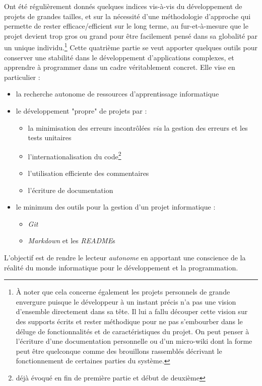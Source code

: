 \documentclass[../../main.tex]{subfiles}
\begin{document}
Ont été régulièrement donnés quelques indices vis-à-vis du développement de projets de grandes tailles, et sur la nécessité d'une méthodologie d'approche qui permette de rester efficace/efficient sur le long terme, au fur-et-à-mesure que le projet devient trop gros ou grand pour être facilement pensé dans sa globalité par un unique individu.\footnote{À noter que cela concerne également les projets personnels de grande envergure puisque le développeur à un instant précis n'a pas une vision d'ensemble directement dans sa tête. Il lui a fallu découper cette vision sur des supports écrits et rester méthodique pour ne pas s'embourber dans le déluge de fonctionnalités et de caractéristiques du projet. On peut penser à l'écriture d'une documentation personnelle ou d'un micro-wiki dont la forme peut être quelconque comme des brouillons rassemblés décrivant le fonctionnement de certaines parties du système.} Cette quatrième partie se veut apporter quelques outils pour conserver une stabilité dans le développement d'applications complexes, et apprendre à programmer dans un cadre véritablement concret. Elle vise en particulier :
\begin{itemize}
	\item la recherche autonome de ressources d'apprentissage informatique
	\item le développement "propre" de projets par :
	\begin{itemize}
		\item la minimisation des erreurs incontrôlées \textit{via} la gestion des erreurs et les tests unitaires
		\item l'internationalisation du code\footnote{déjà évoqué en fin de première partie et début de deuxième}
		\item l'utilisation efficiente des commentaires
		\item l'écriture de documentation
	\end{itemize}
	\item le minimum des outils pour la gestion d'un projet informatique :
		\begin{itemize}
			\item \textit{Git}
			\item \textit{Markdown} et les \textit{README}s
		\end{itemize}
\end{itemize}
L'objectif est de rendre le lecteur \textit{autonome} en apportant une conscience de la réalité du monde informatique pour le développement et la programmation.

\hrulefill
\newpage
\end{document}
